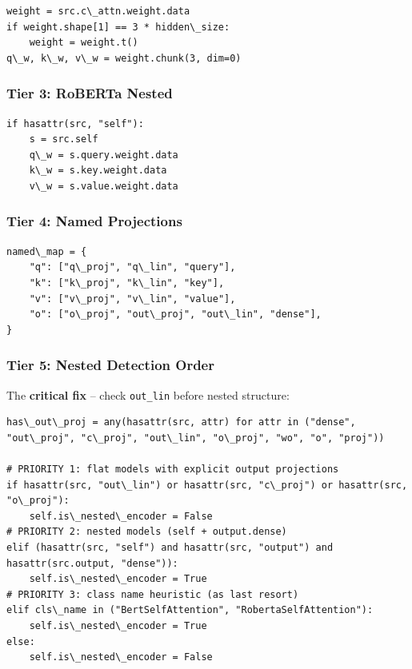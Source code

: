 \begin{lstlisting}
weight = src.c\_attn.weight.data
if weight.shape[1] == 3 * hidden\_size:
    weight = weight.t()
q\_w, k\_w, v\_w = weight.chunk(3, dim=0)
\end{lstlisting}

\subsubsection{Tier 3: RoBERTa Nested}

\begin{lstlisting}
if hasattr(src, "self"):
    s = src.self
    q\_w = s.query.weight.data
    k\_w = s.key.weight.data
    v\_w = s.value.weight.data
\end{lstlisting}

\subsubsection{Tier 4: Named Projections}

\begin{lstlisting}
named\_map = {
    "q": ["q\_proj", "q\_lin", "query"],
    "k": ["k\_proj", "k\_lin", "key"],
    "v": ["v\_proj", "v\_lin", "value"],
    "o": ["o\_proj", "out\_proj", "out\_lin", "dense"],
}
\end{lstlisting}

\subsubsection{Tier 5: Nested Detection Order}

The \textbf{critical fix} -- check \texttt{out\_lin} before nested structure:

\begin{lstlisting}
has\_out\_proj = any(hasattr(src, attr) for attr in ("dense", "out\_proj", "c\_proj", "out\_lin", "o\_proj", "wo", "o", "proj"))

# PRIORITY 1: flat models with explicit output projections
if hasattr(src, "out\_lin") or hasattr(src, "c\_proj") or hasattr(src, "o\_proj"):
    self.is\_nested\_encoder = False
# PRIORITY 2: nested models (self + output.dense)
elif (hasattr(src, "self") and hasattr(src, "output") and hasattr(src.output, "dense")):
    self.is\_nested\_encoder = True
# PRIORITY 3: class name heuristic (as last resort)
elif cls\_name in ("BertSelfAttention", "RobertaSelfAttention"):
    self.is\_nested\_encoder = True
else:
    self.is\_nested\_encoder = False
\end{lstlisting}


